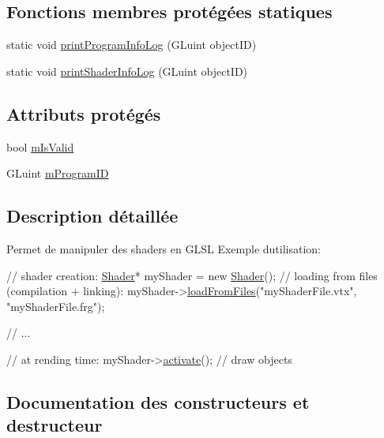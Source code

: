 \subsection*{Fonctions membres protégées statiques}
\begin{DoxyCompactItemize}
\item 
static void \hyperlink{class_shader_ab46602912ae536c070edf4720a254c31}{print\+Program\+Info\+Log} (G\+Luint object\+ID)
\item 
static void \hyperlink{class_shader_af36e2a57d8f789e95b7d014a8ddfaf97}{print\+Shader\+Info\+Log} (G\+Luint object\+ID)
\end{DoxyCompactItemize}
\subsection*{Attributs protégés}
\begin{DoxyCompactItemize}
\item 
bool \hyperlink{class_shader_a2cf5f11fb1cfd53e9106285b6b9da0b4}{m\+Is\+Valid}
\item 
G\+Luint \hyperlink{class_shader_ad3c569bb2c0755c647ca139863d44b55}{m\+Program\+ID}
\end{DoxyCompactItemize}


\subsection{Description détaillée}
Permet de manipuler des shaders en G\+L\+SL Exemple d\textquotesingle{}utilisation\+: 
\begin{DoxyCode}
\textcolor{comment}{// shader creation:}
\hyperlink{class_shader}{Shader}* myShader = \textcolor{keyword}{new} \hyperlink{class_shader_a0d654ebaca4e0555197c0724c6d30610}{Shader}();
\textcolor{comment}{// loading from files (compilation + linking):}
myShader->\hyperlink{class_shader_ab3326b4493672d0e456e05d9b64c7b28}{loadFromFiles}(\textcolor{stringliteral}{"myShaderFile.vtx"}, \textcolor{stringliteral}{"myShaderFile.frg"});

\textcolor{comment}{// ...}

\textcolor{comment}{// at rending time:}
myShader->\hyperlink{class_shader_aac46b11981aef0616f45e191201f519a}{activate}();
\textcolor{comment}{// draw objects}
\end{DoxyCode}
 

\subsection{Documentation des constructeurs et destructeur}
\mbox{\label{class_shader_a0d654ebaca4e0555197c0724c6d30610}} 
